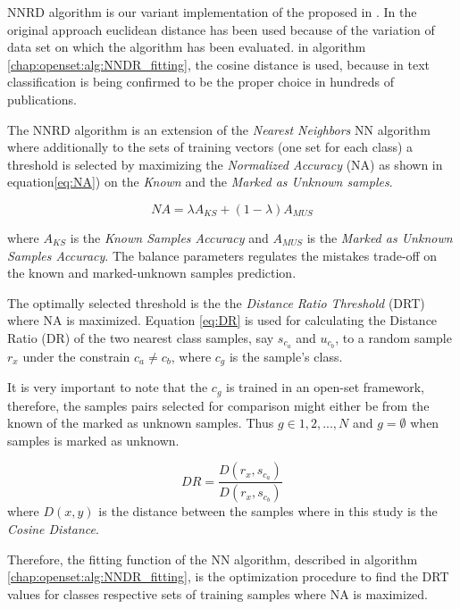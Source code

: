 NNRD algorithm is our variant implementation of the proposed in \parencite{mendesjunior2016}. In the original approach euclidean distance has been used because of the variation of data set on which the algorithm has been evaluated. in algorithm \ref{chap:openset:alg:NNDR_fitting}, the cosine distance is used, because in text classification is being confirmed to be the proper choice in hundreds of publications. 

The NNRD algorithm is an extension of the \textit{Nearest Neighbors} NN algorithm where additionally to the sets of training vectors (one set for each class) a threshold is selected by maximizing the \textit{Normalized Accuracy} (NA) as shown in equation\ref{eq:NA}) on the \textit{Known} and the \textit{Marked as Unknown samples}.

\begin{equation} \label{eq:NA}
    NA = \lambda A_{KS} + (1 - \lambda) A_{MUS}
\end{equation}

\noindent
where $A_{KS}$ is the \textit{Known Samples Accuracy} and $A_{MUS}$ is the \textit{Marked as Unknown Samples Accuracy}. The balance parameters \lambda regulates the mistakes trade-off on the known and marked-unknown samples prediction.

The optimally selected threshold is the the \textit{Distance Ratio Threshold} (DRT) where NA is maximized. Equation \ref{eq:DR} is used for calculating the Distance Ratio (DR) of the two nearest class samples, say $s_{c_{a}}$ and $u_{c_{b}}$, to a random sample $r_{x}$ under the constrain $c_{a} \neq c_{b}$, where $c_{g}$ is the sample's class.

It is very important to note that the $c_{g}$ is trained in an open-set framework, therefore, the samples pairs selected for comparison might either be from the known of the marked as unknown samples. Thus $g \in {1,2,...,N}$ and $g = \emptyset$ when samples is marked as unknown.

\begin{equation} \label{eq:DR}
    DR = \frac{D(r_{x}, s_{c_{a}})}{D(r_{x}, s_{c_{b}})}
\end{equation}
\noindent
where $D(x,y)$ is the distance between the samples where in this study is the \textit{Cosine Distance}.

Therefore, the fitting function of the NN algorithm, described in algorithm \ref{chap:openset:alg:NNDR_fitting}, is the optimization procedure to find the DRT values for classes respective sets of training samples where NA is maximized.

